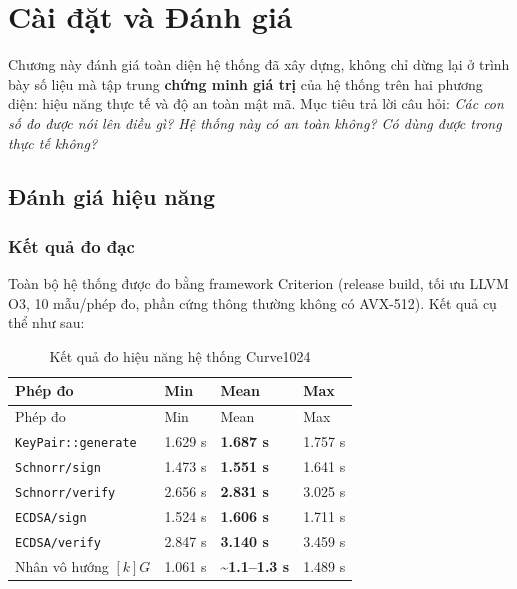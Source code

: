 
\clearpage
{}

\setcounter{chapter}{4}
\chapter[Cài đặt và Đánh giá]{Cài đặt và Đánh giá}

Chương này đánh giá toàn diện hệ thống đã xây dựng, không chỉ dừng lại ở
trình bày số liệu mà tập trung \textbf{chứng minh giá trị} của hệ thống
trên hai phương diện: hiệu năng thực tế và độ an toàn mật mã. Mục tiêu
trả lời câu hỏi: \emph{Các con số đo được nói lên điều gì? Hệ thống này
có an toàn không? Có dùng được trong thực tế không?}

\section{Đánh giá hiệu
năng}\label{ux111uxe1nh-giuxe1-hiux1ec7u-nux103ng}

\subsection{Kết quả đo đạc}\label{kux1ebft-quux1ea3-ux111o-ux111ux1ea1c}

Toàn bộ hệ thống được đo bằng framework Criterion (release build, tối ưu
LLVM O3, 10 mẫu/phép đo, phần cứng thông thường không có AVX-512). Kết
quả cụ thể như sau:

\begin{longtable}[]{@{}llll@{}}
\caption{Kết quả đo hiệu năng hệ thống Curve1024}\tabularnewline
\toprule\noalign{}
Phép đo & Min & Mean & Max \\
\midrule\noalign{}
\endfirsthead
\toprule\noalign{}
Phép đo & Min & Mean & Max \\
\midrule\noalign{}
\endhead
\bottomrule\noalign{}
\endlastfoot
\texttt{KeyPair::generate} & 1.629 s & \textbf{1.687 s} & 1.757 s \\
\texttt{Schnorr/sign} & 1.473 s & \textbf{1.551 s} & 1.641 s \\
\texttt{Schnorr/verify} & 2.656 s & \textbf{2.831 s} & 3.025 s \\
\texttt{ECDSA/sign} & 1.524 s & \textbf{1.606 s} & 1.711 s \\
\texttt{ECDSA/verify} & 2.847 s & \textbf{3.140 s} & 3.459 s \\
Nhân vô hướng \([k]G\) & 1.061 s & \textbf{\textasciitilde1.1--1.3 s} &
1.489 s \\
\end{longtable}

